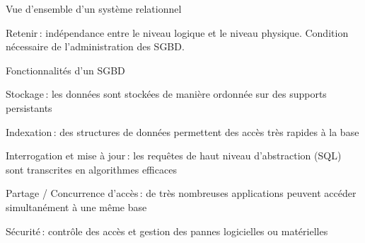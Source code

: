 



\begin{frame}{Vue d'ensemble d'un système relationnel}



\vfill


\begin{blocgauche}
\alert{Retenir}\,: indépendance entre le niveau logique et le niveau physique. Condition
nécessaire de l'administration des SGBD.
\end{blocgauche}

\end{frame}

\begin{frame}{Fonctionnalités d'un SGBD}

\alert{Stockage}\,: les données sont stockées de manière ordonnée sur des supports persistants

\vfill

\alert{Indexation}\,: des structures de données permettent des accès très rapides à la base

\vfill

\alert{Interrogation et mise à jour}\,: les requêtes de haut niveau d'abstraction (SQL) sont transcrites en algorithmes 
efficaces

\vfill

\alert{Partage / Concurrence d'accès}\,: de très nombreuses applications peuvent accéder simultanément à une même base


\vfill
\begin{blocgauche}
\alert{Sécurité}\,: contrôle des accès et gestion des pannes logicielles ou matérielles
\end{blocgauche}

\end{frame}

